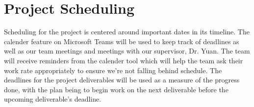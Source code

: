 \documentclass{article}
\begin{document}
\section{Project Scheduling}

Scheduling for the project is centered around important dates in its timeline. The calender feature on Microsoft Teams will be used to keep track of deadlines as well as our team meetings and meetings with our supervisor, Dr. Yuan. The team will receive reminders from the calender tool which will help the team ask their work rate appropriately to ensure we're not falling behind schedule. The deadlines for the project deliverables will be used as a measure of the progress done, with the plan being to begin work on the next deliverable before the upcoming deliverable's deadline.
\end{document}
